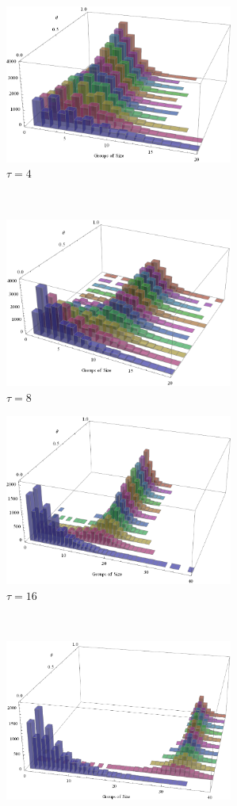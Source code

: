 \documentclass[Main.tex]{subfiles}
\begin{document}
\begin{figure}[!htb]
\begin{subfigure}{0.5\textwidth}
\centering\includegraphics[width=7.5cm]{assets/collabratesweep4.png}
\centering\caption{$\tau = 4$}\label{fig:collabsweep4}
\end{subfigure}~
\begin{subfigure}{0.5\textwidth}
\centering\includegraphics[width=7.5cm]{assets/collabratesweep8.png}
\centering\caption{$\tau = 8$}\label{fig:collabsweep8}
\end{subfigure}
\begin{subfigure}{0.5\textwidth}
\centering\includegraphics[width=7.5cm]{assets/collabratesweep16.png}
\centering\caption{$\tau = 16$}\label{fig:collabsweep16}
\end{subfigure}~
\begin{subfigure}{0.5\textwidth}
\centering\includegraphics[width=7.5cm]{assets/collabratesweep32.png}

\end{subfigure}
\end{figure}
\end{document}
